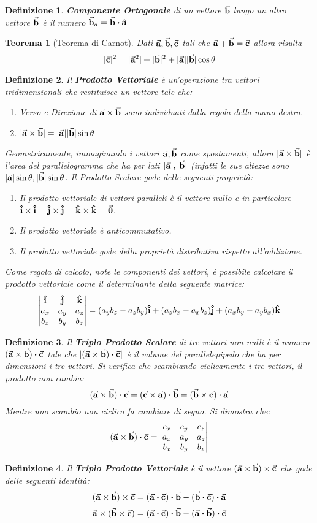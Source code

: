 \documentclass{article}
\newtheorem{thm}{Teorema}[section]
\newtheorem{defn}{Definizione}[section]
\renewcommand{\i}{\vu{i}}
\renewcommand{\j}{\vu{j}}
\renewcommand{\k}{\vu{k}}
\renewcommand{\a}{\va{a}}
\renewcommand{\b}{\va{b}}
\renewcommand{\c}{\va{c}}
\begin{document}
\begin{defn}
\textbf{Componente Ortogonale} di un vettore $\b$ lungo un altro vettore $\b$ è il numero $\b_a=\b\vdot\vu{a}$
\end{defn}

\begin{thm}[Teorema di Carnot]
Dati \(\a,\b,\c\) tali che \(\a+\b=\c\) allora risulta 
\[|\c|^2=|\a^2|+|\b|^2+|\a||\b|\cos\theta\]
\end{thm}

\begin{defn}
Il \textbf{Prodotto Vettoriale} è un'operazione tra vettori tridimensionali che restituisce un vettore tale che:
\begin{enumerate}
    \item Verso e Direzione di $\a\times\b$ sono individuati dalla regola della mano destra.
    \item \(|\a\times\b|=|\a||\b|\sin\theta\)
\end{enumerate}
Geometricamente, immaginando i vettori $\a,\b$ come spostamenti, allora $|\a\times\b|$ è l'area del parallelogramma che ha per lati $|\a|,|\b|$ (infatti le sue altezze sono $|\a|\sin\theta,|\b|\sin\theta$.
Il Prodotto Scalare gode delle seguenti proprietà:
\begin{enumerate}
    \item Il prodotto vettoriale di vettori paralleli è il vettore nullo e in particolare $\i\times\i=\j\times\j=\k\times\k=\va{0}$.
    \item Il prodotto vettoriale è anticommutativo.
    \item Il prodotto vettoriale gode della proprietà distributiva rispetto all'addizione.
\end{enumerate}


Come regola di calcolo, note le componenti dei vettori, è possibile calcolare il prodotto vettoriale come il determinante della seguente matrice:
\[\begin{vmatrix}\i&\j&\k\\ a_x&a_y&a_z\\b_x&b_y&b_z\\ \end{vmatrix}=(a_yb_z-a_zb_y)\i+(a_zb_x-a_xb_z)\j+(a_xb_y-a_yb_x)\k\]
\end{defn}

\begin{defn}
Il \textbf{Triplo Prodotto Scalare} di tre vettori non nulli è il numero $(\a\times\b)\vdot\c$ tale che $|(\a\times\b)\vdot\c|$ è il volume del parallelepipedo che ha per dimensioni i tre vettori. Si verifica che scambiando ciclicamente i tre vettori, il prodotto non cambia:
\[(\a\times\b)\vdot\c=(\c\times\a)\vdot\b=(\b\times\c)\vdot\a\]
Mentre uno scambio non ciclico fa cambiare di segno.
Si dimostra che:
\[(\a\times\b)\vdot\c=\begin{vmatrix}c_x&c_y&c_z\\ a_x&a_y&a_z\\b_x&b_y&b_z\\ \end{vmatrix}\]
\end{defn}

\begin{defn}
Il \textbf{Triplo Prodotto Vettoriale} è il vettore $(\a\times\b)\times\c$ che gode delle seguenti identità:
\[(\a\times\b)\times\c=(\a\vdot\c)\vdot\b-(\b\vdot\c)\vdot\a\]
\[\a\times(\b\times\c)=(\a\vdot\c)\vdot\b-(\a\vdot\b)\vdot\c\]
\end{defn}
\end{document}
